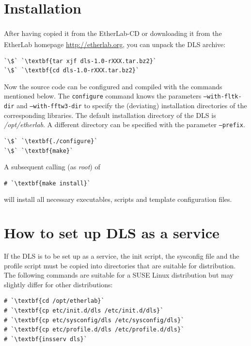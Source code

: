 \documentclass[a4paper,12pt,BCOR6mm,bibtotoc,idxtotoc]{scrbook}
\begin{document}
\section{Installation}

After having copied it from the EtherLab\textsuperscript{\textregistered}-CD
or downloading it from the EtherLab\textsuperscript{\textregistered} homepage
\url{http://etherlab.org}, you can unpack the DLS archive:

\begin{lstlisting}
`\$` `\textbf{tar xjf dls-1.0-rXXX.tar.bz2}`
`\$` `\textbf{cd dls-1.0-rXXX.tar.bz2}`
\end{lstlisting}

Now the source code can be configured and compiled with the commands mentioned below. The \texttt{configure} command knows the parameters \texttt{--with-fltk-dir} and \texttt{--with-fftw3-dir} to specify the (deviating) installation directories of the corresponding libraries. The default installation directory of the DLS is \textit{/opt/etherlab}. A different directory can be specified with the parameter \texttt{--prefix}.

\begin{lstlisting}
`\$` `\textbf{./configure}`
`\$` `\textbf{make}`
\end{lstlisting}

A subsequent calling (as \textit{root}) of

\begin{lstlisting}
# `\textbf{make install}`
\end{lstlisting}

will install all necessary executables, scripts and template configuration files.

\section{How to set up DLS as a service}

If the DLS is to be set up as a service, the init script, the sysconfig file and the profile script must be copied into directories that are suitable for distribution. The following commands are suitable for a SUSE Linux distribution but may slightly differ for other distributions:

\begin{lstlisting}
# `\textbf{cd /opt/etherlab}`
# `\textbf{cp etc/init.d/dls /etc/init.d/dls}`
# `\textbf{cp etc/sysconfig/dls /etc/sysconfig/dls}`
# `\textbf{cp etc/profile.d/dls /etc/profile.d/dls}`
# `\textbf{insserv dls}`
\end{lstlisting}
\end{document}
